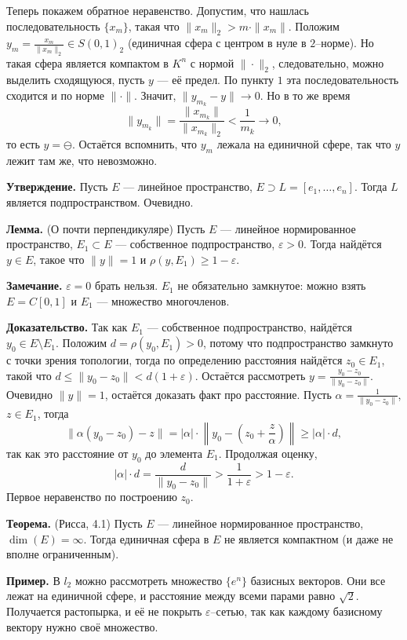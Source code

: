 Теперь покажем обратное неравенство. Допустим, что нашлась последовательность $\{x_m\}$, такая что $\|x_m\|_2 > m \cdot \|x_m\|$.
Положим $y_m = \frac{x_m}{\|x_m\|_2} \in S(0, 1)_2$ (единичная сфера с центром в нуле в $2$--норме).
Но такая сфера является компактом в $K^n$ с нормой $\|\cdot\|_2$, следовательно, можно выделить сходящуюся, пусть $y$ --- её предел.
По пункту $1$ эта последовательность сходится и по норме $\|\cdot\|$.
Значит, $\|y_{m_k} - y\| \to 0$.
Но в то же время
\[
    \|y_{m_k}\| = \frac{\|x_{m_k}\|}{\|x_{m_k}\|_2} < \frac{1}{m_k} \to 0,
\]
то есть $y = \ominus$.
Остаётся вспомнить, что $y_m$ лежала на единичной сфере, так что $y$ лежит там же, что невозможно.

\QED

\textbf{Утверждение.} Пусть $E$ --- линейное пространство, $E \supset L = [e_1, \dots, e_n]$.
Тогда $L$ является подпространством. Очевидно.

\textbf{Лемма.} (О почти перпендикуляре) Пусть $E$ --- линейное нормированное пространство, $E_1 \subset E$ --- собственное подпространство, $\varepsilon > 0$.
Тогда найдётся $y \in E$, такое что $\|y\| = 1$ и $\rho(y, E_1) \ge 1 - \varepsilon$.

\textbf{Замечание.} $\varepsilon = 0$ брать нельзя. $E_1$ не обязательно замкнутое: можно взять $E = C[0, 1]$ и $E_1$ --- множество многочленов.

\textbf{Доказательство.} Так как $E_1$ --- собственное подпространство, найдётся $y_0 \in E \setminus E_1$.
Положим $d = \rho(y_0, E_1) > 0$, потому что подпространство замкнуто с точки зрения топологии, тогда по определению расстояния найдётся $z_0 \in E_1$, такой что $d \le \|y_0 - z_0\| < d(1 + \varepsilon)$.
Остаётся рассмотреть $y = \frac{y_0 - z_0}{\|y_0 - z_0\|}$.
Очевидно $\|y\| = 1$, остаётся доказать факт про расстояние.
Пусть $\alpha = \frac{1}{\|y_0 - z_0\|}$, $z \in E_1$, тогда
\[
    \|\alpha(y_0 - z_0) - z\| = |\alpha| \cdot \left\|y_0 - \left( z_0 + \frac{z}{\alpha} \right) \right\| \ge |\alpha| \cdot d,
\]
так как это расстояние от $y_0$ до элемента $E_1$.
Продолжая оценку,
\[
    |\alpha| \cdot d = \frac{d}{\|y_0 - z_0\|} > \frac{1}{1 + \varepsilon} > 1 - \varepsilon.
\]
Первое неравенство по построению $z_0$.

\QED

\textbf{Теорема.} (Рисса, 4.1) Пусть $E$ --- линейное нормированное пространство, $\dim(E) = \infty$.
Тогда единичная сфера в $E$ не является компактном (и даже не вполне ограниченным).

\textbf{Пример.} В $l_2$ можно рассмотреть множество $\{e^{n}\}$ базисных векторов.
Они все лежат на единичной сфере, и расстояние между всеми парами равно $\sqrt 2$.
Получается растопырка, и её не покрыть $\varepsilon$--сетью, так как каждому базисному вектору нужно своё множество.

